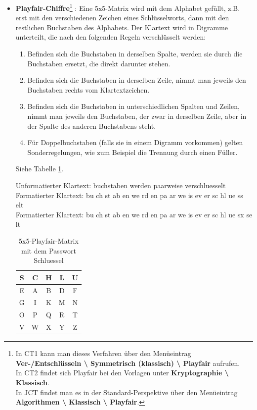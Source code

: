 \begin{refsegment}
\begin{itemize}
   \hypertarget{playfair}{}
\item {\bf Playfair-Chiffre}\footnote{In CT1
   kann man dieses Verfahren über den Menüeintrag {\bf Ver-/Entschlüsseln
   \textbackslash{} Symmetrisch (klassisch) \textbackslash{} Playfair}
   aufrufen.\\
   In CT2 findet sich Playfair bei den Vorlagen unter
   {\bf Kryptographie \textbackslash{} Klassisch}.\\
   In JCT findet man es in der Standard-Perspektive
   über den Menüeintrag {\bf Algorithmen \textbackslash{} Klassisch \textbackslash{}
   Playfair}.
   }
   \cite{Singh2001}:
   Eine 5x5-Matrix wird mit dem Alphabet gefüllt, z.B. erst mit den
   verschiedenen Zeichen eines Schlüsselworts, dann mit den restlichen
   Buchstaben des Alphabets. Der Klartext wird in Digramme unterteilt, die
   nach den folgenden Regeln verschlüsselt werden:
   \begin{enumerate}
      \item Befinden sich die Buchstaben in derselben Spalte, werden sie durch
         die Buchstaben ersetzt, die direkt darunter stehen.
      \item Befinden sich die Buchstaben in derselben Zeile, nimmt man jeweils
         den Buchstaben rechts vom Klartextzeichen.
      \item Befinden sich die Buchstaben in unterschiedlichen Spalten und
         Zeilen, nimmt man jeweils den Buchstaben, der zwar in derselben
         Zeile, aber in der Spalte des anderen Buchstabens steht.
      \item Für Doppelbuchstaben (falls sie in einem Digramm vorkommen)
         gelten Sonderregelungen, wie zum Beispiel
         die Trennung durch einen Füller.
   \end{enumerate}

   Siehe Tabelle \ref{Playfair-table-reference}.

   Unformatierter Klartext: buchstaben werden paarweise verschluesselt\\
   Formatierter Klartext:   bu ch st ab en we rd en pa ar we is ev er sc hl ue ss elt\\
   Formatierter Klartext:   bu ch st ab en we rd en pa ar we is ev er sc hl ue sx se lt

   \begin{table}[ht]
   \begin{center}
   \begin{tabular}{|c|c|c|c|c|}
   \hline
	S & C & H & L & U\\
   \hline
	E & A & B & D & F\\
   \hline
	G & I & K & M & N\\
   \hline
	O & P & Q & R & T\\
   \hline
	V & W & X & Y & Z\\
   \hline
   \end{tabular}
   \caption{5x5-Playfair-Matrix mit dem Passwort \glqq Schluessel\grqq}
   \label{Playfair-table-reference}
   \end{center}
   \end{table}


\end{itemize}
\end{refsegment}
